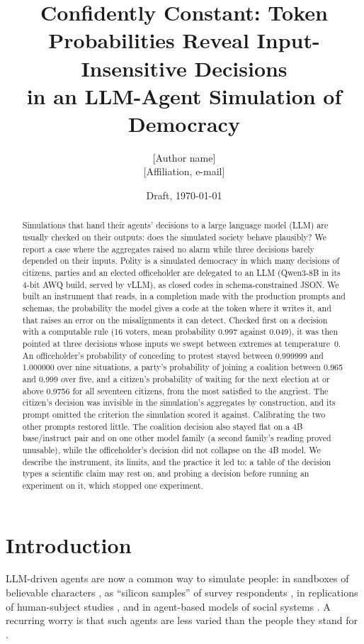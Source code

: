 \documentclass[11pt]{article}
\title{Confidently Constant: Token Probabilities Reveal Input-Insensitive Decisions\\
in an LLM-Agent Simulation of Democracy}
\author{[Author name]\\[2pt]\small [Affiliation, e-mail]}
\date{Draft, \today}
\begin{document}
\maketitle

\begin{abstract}
Simulations that hand their agents' decisions to a large language model (LLM) are usually
checked on their outputs: does the simulated society behave plausibly? We report a case where
the aggregates raised no alarm while three decisions barely depended on their inputs. Polity is
a simulated democracy in which many decisions of citizens, parties and an elected officeholder
are delegated to an LLM (Qwen3-8B in its 4-bit AWQ build, served by vLLM), as closed codes in
schema-constrained JSON. We built an instrument that reads, in a completion made with the production
prompts and schemas, the probability the model gives a code at the token where it writes it,
and that raises an error on the misalignments it can detect. Checked first on a decision with a computable rule (16 voters, mean probability 0.997
against 0.049), it was then pointed at three decisions whose inputs we swept between extremes at
temperature~0. An officeholder's probability of conceding to protest stayed between 0.999999 and
1.000000 over nine situations, a party's probability of joining a coalition between 0.965 and
0.999 over five, and a citizen's probability of waiting for the next election at or above
0.9756 for all seventeen citizens, from the most satisfied to the angriest. The citizen's
decision was invisible in the simulation's aggregates by construction, and its prompt omitted
the criterion the simulation scored it against. Calibrating the two other prompts restored
little. The coalition decision also stayed flat on a 4B base/instruct pair and on one other
model family (a second family's reading proved unusable), while the officeholder's decision did
not collapse on the 4B model. We describe the instrument, its limits, and the practice it led to:
a table of the decision types a scientific claim may rest on, and probing a decision before
running an experiment on it, which stopped one experiment.
\end{abstract}

\section{Introduction}

LLM-driven agents are now a common way to simulate people: in sandboxes of believable
characters \citep{park2023generative}, as ``silicon samples'' of survey respondents
\citep{argyle2023outofone}, in replications of human-subject studies \citep{aher2023turing}, and
in agent-based models of social systems \citep{gao2024abmsurvey}. A recurring worry is that such
agents are less varied than the people they stand for
\citep{bisbee2024synthetic,wang2025flatten,anthis2025position}.
\end{document}
